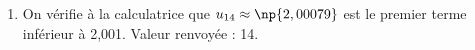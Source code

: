 \begin{enumerate}
\begin{enumerate}



\item On vérifie à la calculatrice que $u_{14} \approx \np{2,00079}$ est le premier terme inférieur à 2,001. Valeur renvoyée : 14.
	\end{enumerate}
\end{enumerate}

\bigskip

